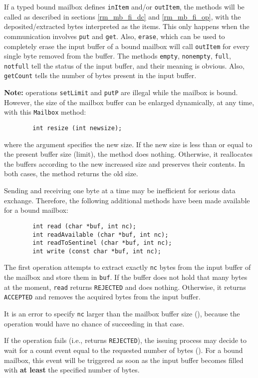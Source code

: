 If a typed bound mailbox defines {\tt inItem} and/or {\tt outItem},
the methods will be called as described in sections
\ref{rm_mb_fi_dc} and \ref{rm_mb_fi_op}, with the deposited/extracted bytes
interpreted as the items.
This only happens when the communication involves {\tt put} and {\tt get}.
Also, {\tt erase}, which can be used to completely erase the input buffer
of a bound mailbox will call {\tt outItem} for every single byte removed
from the buffer.
The methods {\tt empty}, {\tt nonempty}, {\tt full}, {\tt notfull} tell the
status of the input buffer, and their meaning is obvious.
Also, {\tt getCount} tells the number of bytes present in the input buffer.

\noindent
{\bf Note:} operations {\tt setLimit} and {\tt putP} are illegal while the
mailbox is bound.
However, the size of the mailbox buffer can be enlarged dynamically, at any
time, with this {\tt Mailbox} method:

\begin{verbatim}
        int resize (int newsize);
\end{verbatim}
where the argument specifies the new size.
If the new size is less than or equal to the present buffer size (limit),
the method does nothing.
Otherwise, it reallocates the buffers according to the new increased size
and preserves their contents.
In both cases, the method returns the old size.

\medskip

Sending and receiving one byte at a time may be inefficient for serious
data exchange.
Therefore, the following additional methods have been made available
for a bound mailbox:
\begin{verbatim}
        int read (char *buf, int nc);
        int readAvailable (char *buf, int nc);
        int readToSentinel (char *buf, int nc);
        int write (const char *buf, int nc);
\end{verbatim}

The first operation attempts to extract exactly {\tt nc} bytes from the
input buffer of the mailbox and store them in {\tt buf}.
If the buffer does not hold that many bytes at the moment, {\tt read} returns
{\tt REJECTED} and does nothing.
Otherwise, it returns {\tt ACCEPTED} and removes the acquired bytes from
the input buffer.

It is an error to specify {\tt nc} larger than the mailbox buffer size
(), because the operation would have no chance of
succeeding in that case.

If the operation fails (i.e., returns {\tt REJECTED}), the issuing process
may decide to wait for a count event equal to the requested number of bytes
().
For a bound mailbox, this event will be triggered as soon as the input
buffer becomes filled with {\bf at least} the specified number of bytes.

